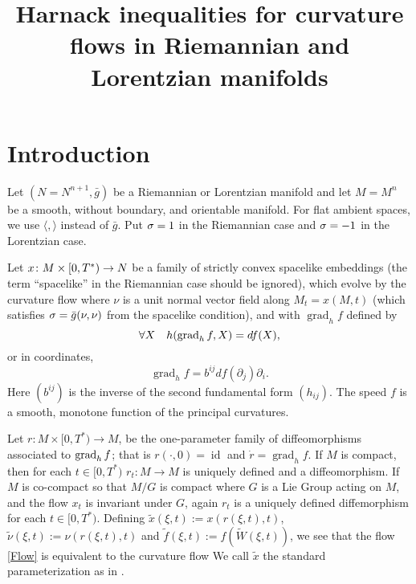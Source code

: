 
\usepackage{mathrsfs}
\DeclareMathOperator{\ad}{ad}
\newenvironment{hproof}{%
  \renewcommand{\proofname}{Sketch of proof}\proof}{\endproof}




\title[Harnack inequalities for curvature flows]{Harnack inequalities for curvature flows in Riemannian and Lorentzian manifolds}
\maketitle
\section{Introduction}
\label{sec:intro}
Let $(N=N^{n+1},\bar{g})$ be a Riemannian or Lorentzian manifold and let $M=M^{n}$ be a smooth, without boundary, and orientable manifold. For flat ambient spaces, we use $\langle,\rangle$ instead of $\bar{g}.$ Put $\sigma = 1$ in the Riemannian case and $\sigma = -1$ in the Lorentzian case.

Let
$x\colon M\times[0,T^{\ast})\rightarrow N$
be a family of strictly convex spacelike embeddings (the term ``spacelike'' in the Riemannian case should be ignored), which evolve by the curvature flow
where $\nu$ is a unit normal vector field along $M_{t}=x(M,t)$ (which satisfies $\sigma=\bar{g}(\nu,\nu)$ from the spacelike condition), and with $\operatorname{grad}_hf$ defined by
\[
\forall X \quad h(\operatorname{grad}_h f, X) = df (X),
\]
or in coordinates,
\[\operatorname{grad}_hf=b^{ij}df(\partial_j)\partial_i.\]
Here $(b^{ij})$ is the inverse of the second fundamental form $(h_{ij})$. The speed $f$ is a smooth, monotone function of the principal curvatures.

Let \(r:M\times [0,T^{\ast})\to M\), be the one-parameter family of diffeomorphisms associated to $\operatorname{grad}_h f$; that is $r(\cdot,0)=\operatorname{id}$ and $\dot{r}=\operatorname{grad}_hf$. If $M$ is compact, then for each $t \in [0, T^{\ast})$ $r_t : M \to M$ is uniquely defined and a diffeomorphism. If $M$ is co-compact so that $M/G$ is compact where $G$ is a Lie Group acting on $M$, and the flow $x_t$ is invariant under $G$, again $r_t$ is a uniquely defined diffemorphism for each $t \in [0, T^{\ast})$. Defining $\tilde{x} (\xi, t) := x (r(\xi,t), t)$, $\tilde{\nu} (\xi, t) :=\nu (r(\xi,t), t)$ and $\tilde{f}(\xi,t):=f(\tilde{W} (\xi, t))$, we see that the flow \eqref{Flow} is equivalent to the curvature flow
\eq{\label{FlowStandard}
\tilde{x}&:M\times [0,T^{\ast})\to N\\
\dot{\tilde{x}} &= -\s \tilde{f} \tilde{\nu}.}
We call $\tilde{x}$ the standard parameterization as in \cite{Andrews:09/1994}.

